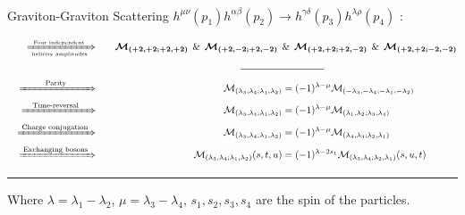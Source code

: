 \documentclass[aspectratio=169,usenames,dvipsnames]{beamer}
\begin{document}
\begin{frame}{\centering {}\\
    \small Graviton-Graviton Scattering  $h^{\mu\nu}(p_1) h^{\alpha\beta}(p_2) \rightarrow h^{\gamma\delta}(p_3) h^{\lambda\rho}(p_4)$ :}
\begin{tcolorbox}[enhanced,width=\textwidth,colframe=LUCopper,arc=4pt,boxrule=1pt,drop
  fuzzy shadow]
\setlength{\belowdisplayskip}{0pt}
\setlength{\abovedisplayskip}{0pt}
\begin{alignat*}{3}
 &&  \xRightarrow[\; \text{\tiny{helicity amplitudes}}  \;]{\;\;
    \text{\tiny{Four independent}}  \;\;\,}  \quad &&
  \boldsymbol{\mathcal{M}_{(+2,+2;+2,+2)}} \;\, \text{\&} \,\;
  \boldsymbol{\mathcal{M}_{(+2,-2;+2,-2)}} \;\, & \text{\&}\,\; \boldsymbol{\mathcal{M}_{(+2,+2;+2,-2)}}
  \;\, \text{\&}\,\; \boldsymbol{\mathcal{M}_{(+2,+2;-2,-2)}}  \\
&& && \mathclap{\rule{3cm}{0.5pt}} & \\[1mm]
&& \xRightarrow{\;\qquad\; \text{Parity}\; \;\qquad} \quad && \mathcal{M}_{(\lambda_3,\lambda_4;\lambda_1,\lambda_2)} & = (-1)^{\lambda-\mu}
  \mathcal{M}_{(-\lambda_3,-\lambda_4;-\lambda_1,-\lambda_2)}   \\
&& \xRightarrow{\;\;\;\;\text{Time-reversal}\,\;\;\;\,\;} \quad && \mathcal{M}_{(\lambda_3,\lambda_4;\lambda_1,\lambda_2)} & =
    (-1)^{\lambda-\mu} \mathcal{M}_{(\lambda_1,\lambda_2;\lambda_3,\lambda_4)}  \\
&&  \xRightarrow{\;\text{Charge conjugation}\;} \quad && \mathcal{M}_{(\lambda_3,\lambda_4;\lambda_1,\lambda_2)}  & =
    (-1)^{\lambda-\mu} \mathcal{M}_{(\lambda_4,\lambda_3;\lambda_2,\lambda_1)} \\
&&  \xRightarrow{\;\text{Exchanging bosons}\;} \quad &&
\mathcal{M}_{(\lambda_3,\lambda_4;\lambda_1,\lambda_2)} (s,t,u) & =
(-1)^{\lambda-2s_1} \mathcal{M}_{(\lambda_3,\lambda_4;\lambda_2,\lambda_1)} (s,u,t)
\end{alignat*}  
\end{tcolorbox}
\vspace{0.8mm}
\textcolor{LUCopper}{\rule{\textwidth}{1pt}}
\raggedright\tiny Where $\lambda =\lambda_1-\lambda_2$,\;  $\mu=\lambda_3-\lambda_4
    $,\; $s_1,s_2,s_3,s_4$ are the spin of the particles.
\vspace{100mm}

\end{frame}
\end{document}
